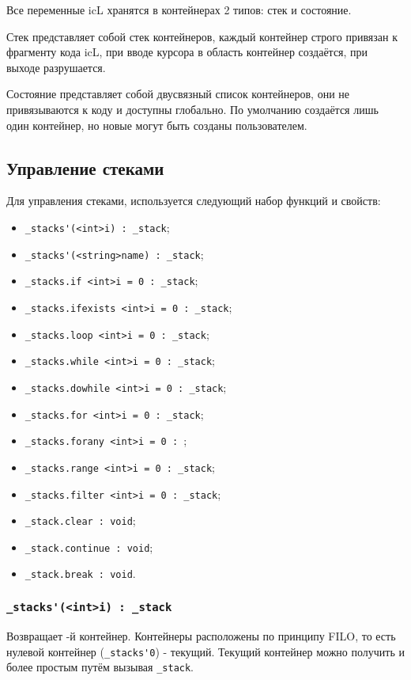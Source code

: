 \documentclass[a4paper, 14pt]{extarticle}
\newenvironment{icItems}
	{ \begin{itemize} [noitemsep,nolistsep] }
	{ \end{itemize} }
\begin{document}
Все переменные icL хранятся в контейнерах 2 типов: стек и состояние.

Стек представляет собой стек контейнеров, каждый контейнер строго привязан к фрагменту кода icL, при вводе курсора в область контейнер создаётся, при выходе разрушается.

Состояние представляет собой двусвязный список контейнеров, они не привязываются к коду и доступны глобально. По умолчанию создаётся лишь один контейнер, но новые могут быть созданы пользователем.

\subsection{Управление стеками}

Для управления стеками, используется следующий набор функций и свойств:
\begin{icItems}
	\item \lstinline|_stacks'(<int>i) : _stack|;
	\item \lstinline|_stacks'(<string>name) : _stack|;
	\item \lstinline|_stacks.if <int>i = 0 : _stack|;
	\item \lstinline|_stacks.ifexists <int>i = 0 : _stack|;
	\item \lstinline|_stacks.loop <int>i = 0 : _stack|;
	\item \lstinline|_stacks.while <int>i = 0 : _stack|;
	\item \lstinline|_stacks.dowhile <int>i = 0 : _stack|;
	\item \lstinline|_stacks.for <int>i = 0 : _stack|;
	\item \lstinline|_stacks.forany <int>i = 0 : |;
	\item \lstinline|_stacks.range <int>i = 0 : _stack|;
	\item \lstinline|_stacks.filter <int>i = 0 : _stack|;
	\item \lstinline|_stack.clear : void|;
	\item \lstinline|_stack.continue : void|;
	\item \lstinline|_stack.break : void|.
\end{icItems}

\subsubsection{\lstinline|_stacks'(<int>i) : _stack|}

Возвращает -й контейнер. Контейнеры расположены по принципу FILO, то есть нулевой контейнер (\lstinline|_stacks'0|) - текущий. Текущий контейнер можно получить и более простым путём вызывая \lstinline|_stack|.
\end{document}
